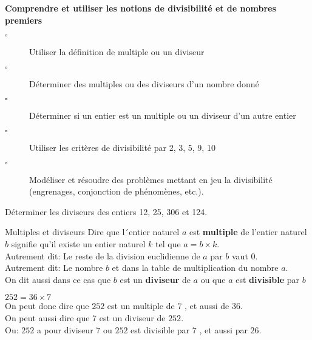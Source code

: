 \begin{titre}[Arithmétique]

\end{titre}


\begin{CpsCol}
\textbf{Comprendre et utiliser les notions de divisibilité et de nombres premiers}
\begin{description}
\item[$\square$] Utiliser la définition de multiple ou un diviseur
\item[$\square$] Déterminer des multiples ou des diviseurs d'un nombre donné
\item[$\square$] Déterminer si un entier est un multiple ou un diviseur d'un autre entier 
\item[$\square$] Utiliser les critères de divisibilité par 2, 3, 5, 9, 10 
\item[$\square$] Modéliser et résoudre des problèmes mettant en jeu la divisibilité (engrenages, conjonction de phénomènes, etc.).
\end{description}
\end{CpsCol}


Déterminer les diviseurs des entiers 12, 25, 306 et 124. 







\begin{DefT}{ Multiples et diviseurs}
Dire que l´entier naturel $a$ est \textbf{multiple} de l'entier naturel $b$ signifie qu'il existe un entier naturel $k$ tel que $a=b \times k$.\\
Autrement dit: Le reste de la division euclidienne de $a$ par $b$ vaut $0$.\\
Autrement dit: Le nombre $b$ et dans la table de multiplication du nombre $a$.\\
On dit aussi dans ce cas que $b$ est un \textbf{diviseur} de $a$ ou que $a$ est \textbf{divisible} par $b$
\end{DefT}



\begin{Ex}
$252=36 \times 7$\\
On peut donc dire que $252$ est un multiple de $7$ , et aussi de $36$.\\
On peut aussi dire que $7$ est un diviseur de $252$.\\
Ou: $252$ a pour diviseur $7$ ou  $252$ est divisible par $7$ , et aussi par $26$.
\end{Ex}

